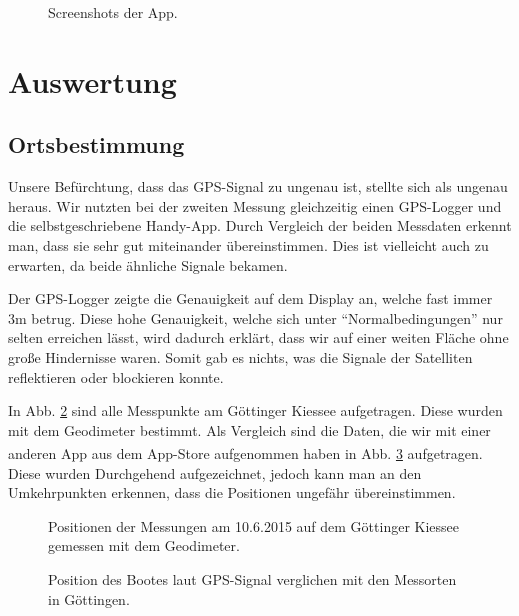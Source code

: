 \documentclass[12pt,a4paper,titlepage,headinclude,bibtotoc]{scrartcl}
\begin{document}
\begin{figure}[h]
  \caption{Screenshots der App.}
  \label{fig:appScreenshots}
\end{figure}


\section{Auswertung}
\label{sec:auswertung}

\subsection{Ortsbestimmung}

Unsere Befürchtung, dass das GPS-Signal zu ungenau ist, stellte sich als ungenau heraus.
Wir nutzten bei der zweiten Messung gleichzeitig einen GPS-Logger und die selbstgeschriebene Handy-App.
Durch Vergleich der beiden Messdaten erkennt man, dass sie sehr gut miteinander übereinstimmen.
Dies ist vielleicht auch zu erwarten, da beide ähnliche Signale bekamen.

Der GPS-Logger zeigte die Genauigkeit auf dem Display an, welche fast immer 3m betrug.
Diese hohe Genauigkeit, welche sich unter "`Normalbedingungen"' nur selten erreichen lässt, wird dadurch erklärt, dass wir auf einer weiten Fläche ohne große Hindernisse waren.
Somit gab es nichts, was die Signale der Satelliten reflektieren oder blockieren konnte.


In Abb. \ref{fig:einzelGPSGoe} sind alle Messpunkte am Göttinger Kiessee aufgetragen.
Diese wurden mit dem Geodimeter bestimmt.
Als Vergleich sind die Daten, die wir mit einer anderen App aus dem App-Store\textsuperscript{\textregistered}  aufgenommen haben in Abb. \ref{fig:GPSGoe} aufgetragen.
Diese wurden Durchgehend aufgezeichnet, jedoch kann man an den Umkehrpunkten erkennen, dass die Positionen ungefähr übereinstimmen.

\begin{figure}[h]
\centering

\caption{Positionen der Messungen am 10.6.2015 auf dem Göttinger Kiessee gemessen mit dem Geodimeter.}
\label{fig:einzelGPSGoe}
\end{figure}
\begin{figure}[h]
\centering

\caption{Position des Bootes laut GPS-Signal verglichen mit den Messorten in Göttingen.}
\label{fig:GPSGoe}
\end{figure}
\end{document}
